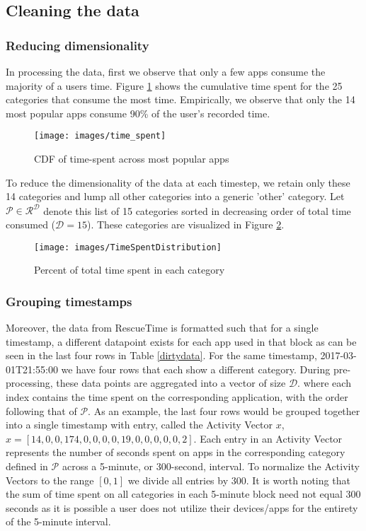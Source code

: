 \subsection{Cleaning the data}

\subsubsection{Reducing dimensionality}
In processing the data, first we observe that only a few apps consume the majority of a users time. Figure \ref{time_spent} shows the cumulative time spent for the 25 categories that consume the most time. Empirically, we observe that only the 14 most popular apps consume 90\% of the user's recorded time.\\

\begin{figure}[htbp]
 \centering
 \caption{CDF of time-spent across most popular apps}
 \label{time_spent}
 \texttt{[image: images/time\_spent]}
\end{figure}

To reduce the dimensionality of the data at each timestep, we retain only these 14 categories and lump all other categories into a generic 'other' category. Let $\mathcal{P} \in \mathcal{R}^\mathcal{D}$ denote this list of 15 categories sorted in decreasing order of total time consumed ($\mathcal{D} = 15$). These categories are visualized in Figure \ref{TimeSpentDistribution}.\\

\begin{figure}[htbp]
 \centering
 \caption{Percent of total time spent in each category}
 \label{TimeSpentDistribution}
 \texttt{[image: images/TimeSpentDistribution]}
\end{figure}

\subsubsection{Grouping timestamps} \label{group_t}
Moreover, the data from RescueTime is formatted such that for a single timestamp, a different datapoint exists for each app used in that block as can be seen in the last four rows in Table \ref{dirtydata}. For the same timestamp, 2017-03-01T21:55:00 we have four rows that each show a different category. During pre-processing, these data points are aggregated into a vector of size $\mathcal{D}$.
where each index contains the time spent on the corresponding application, with the order following that of $\mathcal{P}$. As an example, the last four rows would be grouped together into a single timestamp with entry, called the Activity Vector $x$, $x = [14,0,0,174,0,0,0,0,19,0,0,0,0,0,2]$. Each entry in an Activity Vector represents the number of seconds spent on apps in the corresponding category defined in $\mathcal{P}$ across a 5-minute, or 300-second, interval. To normalize the Activity Vectors to the range $[0,1]$ we divide all entries by 300. It is worth noting that the sum of time spent on all categories in each 5-minute block need not equal 300 seconds as it is possible a user does not utilize their devices/apps for the entirety of the 5-minute interval.

